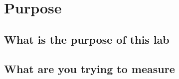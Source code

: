 \chapter{Purpose}
\section{What is the purpose of this lab}
\section{What are you trying to measure}

